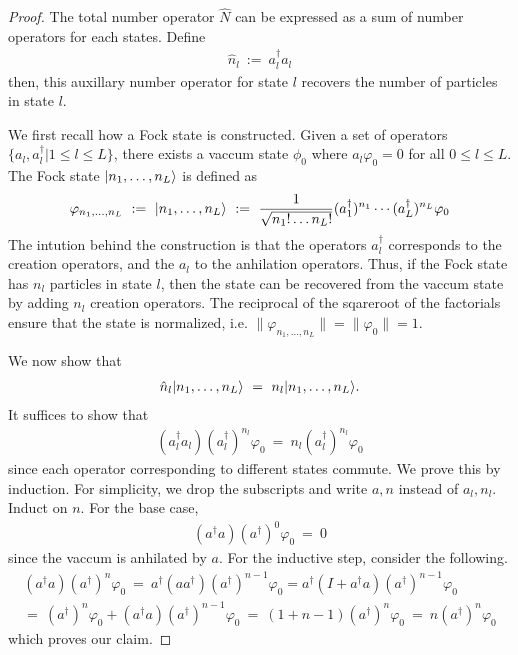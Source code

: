 \documentclass{article}
\numberwithin{equation}{section}
\DeclarePairedDelimiter\ket{\lvert}{\rangle}
\begin{document}
\begin{proof}
    The total number operator $\hat N$ can be expressed as a sum of
    number operators for each states. Define 
    \begin{align}
        \hat n_l \ := \ a_l^\dag a_l
    \end{align}
    then, this auxillary number operator for state $l$ recovers the 
    number of particles in state $l$. 

    We first recall how a Fock state is constructed. Given a set of 
    operators $\{a_l, a_l^\dag| 1 \leq l \leq L\}$, there exists a 
    vaccum state $\phi_0$ where $a_l \varphi_0 = 0$ for all $0 \leq l \leq L$. 
    The Fock state $\ket{n_1, \dots, n_L}$ is defined as 
    \begin{align}
        \varphi_{n_1, \dots, n_L} \ := \ \ket{n_1, \dots, n_L} \
        := \  \frac 1 
        {\sqrt{ {n_1! \dots n_L!}}} (a_1^\dag)^{n_1} \cdots (a_L^\dag)^{n_L} \varphi_0
    \end{align}
    The intution behind the construction is that the operators 
    $a_l^\dag$ corresponds to the creation operators, and the $a_l$ 
    to the anhilation operators. Thus, if the Fock state has $n_l$ 
    particles in state $l$, then the state can be recovered from the 
    vaccum state by adding $n_l$ creation operators. The reciprocal 
    of the sqareroot of the factorials ensure that the state is normalized, 
    i.e. $\|\varphi_{n_1, \dots, n_L}\| = \|\varphi_0\| = 1$. 

    We now show that 
    \begin{align}
        \hat n_l \ket{n_1, \dots, n_L} \ =\ n_l \ket{n_1, \dots, n_L}.
    \end{align}
    It suffices to show that 
    \begin{align}
        (a_l^\dag a_l) (a_l^\dag)^{n_l} \varphi_0 \ = \ n_l(a_l^\dag)^{n_l} \varphi_0
    \end{align}
    since each operator corresponding to different states commute. 
    We prove this by induction. For simplicity, we drop the subscripts 
    and write $a, n$ instead of $a_l, n_l$. Induct on $n$. For the 
    base case, 
    \begin{align}
        (a^\dag a) (a^\dag)^0 \varphi_0 \ = \ 0 
    \end{align}
    since the vaccum is anhilated by $a$. For the inductive step, 
    consider the following. 
    \begin{align}
        (a^\dag a) (a^\dag)^n \varphi_0\ = \ 
        a^\dag (a a^\dag) (a^\dag)^{n -1 }\varphi_0 = 
        a^\dag (I + a^\dag a)(a^\dag)^{n -1 } \varphi_0  \\ 
        = \ (a^\dag)^n \varphi_0 + (a^\dag a) (a^\dag)^{n - 1}\varphi_0 
        \ = \ (1 + n - 1) (a^\dag)^n \varphi_0 \ = \ 
        n (a^\dag)^n \varphi_0
        \end{align}
    which proves our claim. 


\end{proof}
\end{document}
